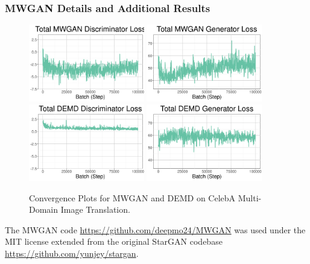 \subsubsection{MWGAN Details and Additional Results}\label{sec:app-mwgan}
\begin{figure}
    \centering
    \includegraphics[width=0.45\textwidth]{6_demd/figs/mwgan_disc_convergence.png}
    \includegraphics[width=0.45\textwidth]{6_demd/figs/mwgan_gen_convergence.png}
    \includegraphics[width=0.45\textwidth]{6_demd/figs/demd_disc_convergence.png}
    \includegraphics[width=0.45\textwidth]{6_demd/figs/demd_gen_convergence.png}
    \caption{Convergence Plots for MWGAN and DEMD on CelebA Multi-Domain Image Translation.}
    \label{fig:convergence}
\end{figure}

The MWGAN code \url{https://github.com/deepmo24/MWGAN} was used under the MIT license extended from the original StarGAN codebase \url{https://github.com/yunjey/stargan}.

